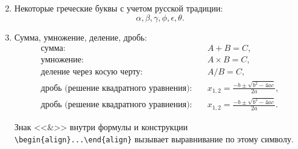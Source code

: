 \begin{enumerate}
{\begin{equation}
	\end{equation}
}%
\item Некоторые греческие буквы с учетом русской традиции:	
{\zerodisplayskips
	\begin{equation}
	\alpha,\beta,\gamma,\phi,\epsilon,\theta. \label{eq:ф5}
	\end{equation}
}%
\item Сумма, умножение, деление, дробь:
{\zerodisplayskips
	\begin{align}
	\text{сумма:}\quad & A+B=C, \label{eq:ф6}\\
	\text{умножение:}\quad & A\times B=C, \label{eq:ф7}\\
	\text{деление через косую черту:}\quad & A/B=C, \label{eq:ф8}\\
	\text{дробь (решение квадратного уравнения):}\quad & x_{1,2}=\frac{-b\pm\sqrt{b^2-4ac}}{2a}, \label{eq:ф9}\\
	\text{дробь (решение квадратного уравнения):}\quad & x_{1,2}=\frac{-b\pm\sqrt{b^2-4ac}}{2a}. \label{eq:ф99}
	\end{align}
}%

Знак <<\&>> внутри формулы и конструкции \verb=\begin{align}...\end{align}= вызывает выравнивание по этому символу. 


\end{enumerate}
